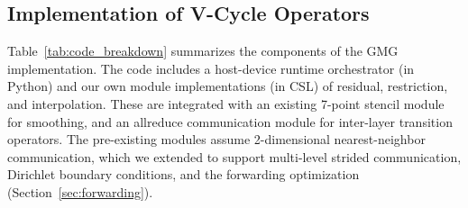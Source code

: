 \documentclass[conference]{IEEEtran}
\begin{document}
        \subsection{Implementation of V-Cycle Operators}
            \label{sec:statemachine}

         

Table~\ref{tab:code_breakdown} summarizes the components of the GMG implementation. 
The code includes a host-device runtime orchestrator (in Python) and our own module implementations (in CSL) of residual, restriction, and interpolation.  These are integrated with an existing 7-point stencil module for smoothing, and an allreduce communication module for inter-layer transition operators.  %
The pre-existing modules assume 2-dimensional nearest-neighbor communication, which we extended to support multi-level strided communication, Dirichlet boundary conditions, and the forwarding optimization  (Section~\ref{sec:forwarding}). %
            

                
\end{document}

